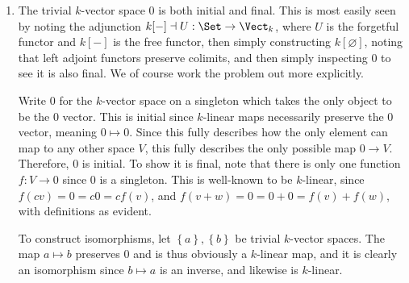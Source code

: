 \documentclass[11pt, letterpaper]{article}
\begin{document}
\begin{enumerate}
	\item The trivial $k$-vector space 0 is both initial and final. This is most easily seen by noting the adjunction $k[-]\dashv U : \Set  \to \Vect_k$, where $U$ is the forgetful functor and $k[-]$ is the free functor, then simply constructing $k[\varnothing ]$, noting that left adjoint functors preserve colimits, and then simply inspecting $0$ to see it is also final. We of course work the problem out more explicitly.

		Write $0$ for the $k$-vector space on a singleton which takes the only object to be the 0 vector. This is initial since $k$-linear maps necessarily preserve the 0 vector, meaning $0\mapsto 0$. Since this fully describes how the only element can map to any other space $V$, this fully describes the only possible map $0\to V$. Therefore, $0$ is initial. To show it is final, note that there is only one function $f : V\to 0$ since $0$ is a singleton. This is well-known to be $k$-linear, since $f(cv)=0=c0=cf(v)$, and $f(v+w)=0=0+0=f(v)+f(w)$, with definitions as evident.

		To construct isomorphisms, let $\left\{ a \right\} ,\left\{ b \right\} $ be trivial $k$-vector spaces. The map $a\mapsto b$ preserves 0 and is thus obviously a $k$-linear map, and it is clearly an isomorphism since $b\mapsto a$ is an inverse, and likewise is $k$-linear.
\end{enumerate}
\end{document}
